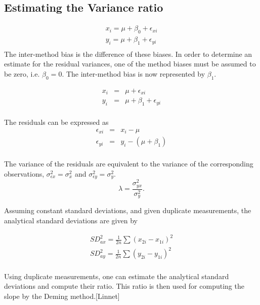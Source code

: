 \documentclass[12pt, a4paper]{report}
\theoremstyle{plain}
\theoremstyle{definition}
\theoremstyle{remark}
\begin{document}
\subsection{Estimating the Variance ratio}


\begin{eqnarray*}
	x_{i} = \mu +  \beta_{0} + \epsilon_{xi}\\
	y_{i} = \mu +  \beta_{1} + \epsilon_{yi}\\
\end{eqnarray*}
The inter-method bias is the difference of these biases. In order to determine an estimate for the residual variances, one of the method biases must be assumed to be zero, i.e. $\beta_{0} = 0$. The inter-method bias is now represented by $\beta_{1}$.

\begin{eqnarray*}
	x_{i} &=& \mu + \epsilon_{xi}\\
	y_{i} &=& \mu +  \beta_{1} + \epsilon_{yi}\\
\end{eqnarray*}

The residuals can be expressed as
\begin{eqnarray*}
	\epsilon_{xi} &=& x_{i} - \mu  \\
	\epsilon_{yi} &=& y_{i} - (\mu + \beta_{1}) \\
\end{eqnarray*}

The variance of the residuals are equivalent to the variance of the corresponding observations, $\sigma^{2}_{\epsilon x} =
\sigma^{2}_{x}$ and $\sigma^{2}_{\epsilon y} = \sigma^{2}_{y}$.
\begin{equation}
\lambda = \frac{\sigma^{2}_{yx}}{\sigma^{2}_{y}}.
\end{equation}

Assuming constant standard deviations, and given duplicate measurements, the analytical standard deviations are given by

\begin{eqnarray*}
	SD^{2}_{ax} = \frac{1}{2n} \sum (x_{2i} - x_{1i})^{2}\\
	SD^{2}_{ay} = \frac{1}{2n} \sum (y_{2i} - y_{1i})^{2}\\
\end{eqnarray*}

Using duplicate measurements, one can estimate the analytical
standard deviations and compute their ratio. This ratio is then
used for computing the slope by the Deming method.[Linnet]
\end{document}
